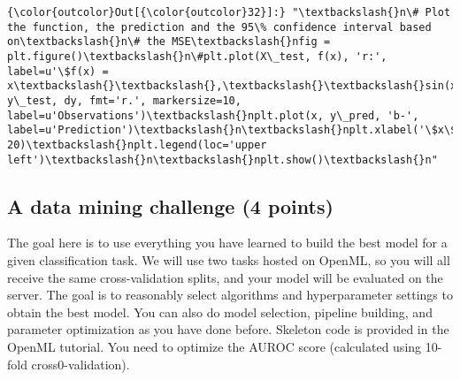 \documentclass[11pt]{article}
\begin{document}
\begin{Verbatim}[commandchars=\\\{\}]
{\color{outcolor}Out[{\color{outcolor}32}]:} "\textbackslash{}n\# Plot the function, the prediction and the 95\% confidence interval based on\textbackslash{}n\# the MSE\textbackslash{}nfig = plt.figure()\textbackslash{}n\#plt.plot(X\_test, f(x), 'r:', label=u'\$f(x) = x\textbackslash{}\textbackslash{},\textbackslash{}\textbackslash{}sin(x)\$')\textbackslash{}nplt.errorbar(X\_train.ravel(), y\_test, dy, fmt='r.', markersize=10, label=u'Observations')\textbackslash{}nplt.plot(x, y\_pred, 'b-', label=u'Prediction')\textbackslash{}n\textbackslash{}nplt.xlabel('\$x\$')\textbackslash{}nplt.ylabel('\$f(x)\$')\textbackslash{}nplt.ylim(-10, 20)\textbackslash{}nplt.legend(loc='upper left')\textbackslash{}n\textbackslash{}nplt.show()\textbackslash{}n"
\end{Verbatim}
            
    \subsection{A data mining challenge (4
points)}\label{a-data-mining-challenge-4-points}

    The goal here is to use everything you have learned to build the best
model for a given classification task. We will use two tasks hosted on
OpenML, so you will all receive the same cross-validation splits, and
your model will be evaluated on the server. The goal is to reasonably
select algorithms and hyperparameter settings to obtain the best model.
You can also do model selection, pipeline building, and parameter
optimization as you have done before. Skeleton code is provided in the
OpenML tutorial. You need to optimize the AUROC score (calculated using
10-fold cross0-validation).
\end{document}
